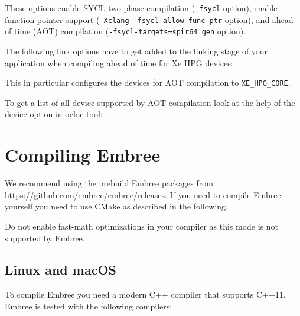 These options enable SYCL two phase compilation (\texttt{-fsycl}
option), enable function pointer support
(\texttt{-Xclang\ -fsycl-allow-func-ptr} option), and ahead of time
(AOT) compilation (\texttt{-fsycl-targets=spir64\_gen} option).

The following link options have to get added to the linking stage of
your application when compiling ahead of time for Xe HPG devices:

\begin{Shaded}
\begin{Highlighting}[]
\OperatorTok{{-}}\OperatorTok{{-}}\OperatorTok{{-}}\OperatorTok{=}
\OperatorTok{{-}}\OperatorTok{{-}}\OperatorTok{{-}}\OperatorTok{=}
\end{Highlighting}
\end{Shaded}

This in particular configures the devices for AOT compilation to
\texttt{XE\_HPG\_CORE}.

To get a list of all device supported by AOT compilation look at the
help of the device option in ocloc tool:

\begin{Shaded}
\begin{Highlighting}[]
\OperatorTok{{-}{-}}
\end{Highlighting}
\end{Shaded}

\chapter{Compiling Embree}\label{compiling-embree}

We recommend using the prebuild Embree packages from
\url{https://github.com/embree/embree/releases}. If you need to compile
Embree yourself you need to use CMake as described in the following.

Do not enable fast-math optimizations in your compiler as this mode is
not supported by Embree.

\section{Linux and macOS}\label{linux-and-macos}

To compile Embree you need a modern C++ compiler that supports C++11.
Embree is tested with the following compilers:

